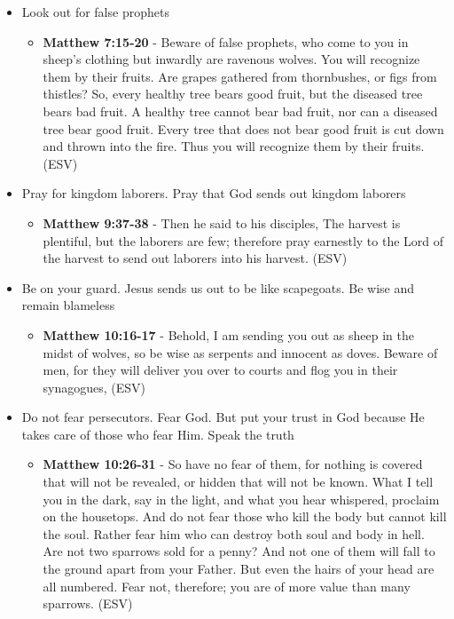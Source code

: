 \documentclass[11pt]{article}
\begin{document}
\begin{itemize}
\begin{itemize}
\end{itemize}
\item Look out for false prophets
\begin{itemize}
\item \textbf{Matthew 7:15-20} - Beware of false prophets, who come to you in sheep's clothing but inwardly are ravenous wolves. You will recognize them by their fruits. Are grapes gathered from thornbushes, or figs from thistles? So, every healthy tree bears good fruit, but the diseased tree bears bad fruit. A healthy tree cannot bear bad fruit, nor can a diseased tree bear good fruit. Every tree that does not bear good fruit is cut down and thrown into the fire. Thus you will recognize them by their fruits. (ESV)
\end{itemize}
\item Pray for kingdom laborers. Pray that God sends out kingdom laborers
\begin{itemize}
\item \textbf{Matthew 9:37-38} - Then he said to his disciples, The harvest is plentiful, but the laborers are few; therefore pray earnestly to the Lord of the harvest to send out laborers into his harvest. (ESV)
\end{itemize}
\item Be on your guard. Jesus sends us out to be like scapegoats. Be wise and remain blameless
\begin{itemize}
\item \textbf{Matthew 10:16-17} - Behold, I am sending you out as sheep in the midst of wolves, so be wise as serpents and innocent as doves. Beware of men, for they will deliver you over to courts and flog you in their synagogues, (ESV)
\end{itemize}
\item Do not fear persecutors. Fear God. But put your trust in God because He takes care of those who fear Him. Speak the truth
\begin{itemize}
\item \textbf{Matthew 10:26-31} - So have no fear of them, for nothing is covered that will not be revealed, or hidden that will not be known. What I tell you in the dark, say in the light, and what you hear whispered, proclaim on the housetops. And do not fear those who kill the body but cannot kill the soul. Rather fear him who can destroy both soul and body in hell. Are not two sparrows sold for a penny? And not one of them will fall to the ground apart from your Father. But even the hairs of your head are all numbered. Fear not, therefore; you are of more value than many sparrows. (ESV)

\end{itemize}
\end{itemize}
\end{document}
